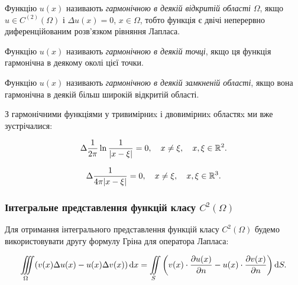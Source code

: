 \begin{definition} 
	Функцію $u(x)$ називають \textit{гармонічною в деякій відкритій області} $\Omega$, якщо $u \in C^{(2)}(\Omega)$ і $\Delta u(x) = 0$, $x \in \Omega$, тобто функція є двічі неперервно диференційованим розв'язком рівняння Лапласа.
\end{definition}

\begin{definition}
	Функцію $u(x)$ називають \textit{гармонічною в деякій точці}, якщо ця функція гармонічна в деякому околі цієї точки.
\end{definition}

\begin{definition}
	Функцію $u(x)$ називають \textit{гармонічною в деякій замкненій області}, якщо вона гармонічна в деякій більш широкій відкритій області.
\end{definition}

З гармонічними функціями у тривимірниx і двовимірниx областяx ми вже зустрічалися:

\begin{example}
	\begin{equation}
		\Delta \frac{1}{2 \pi} \ln \frac{1}{|x - \xi|} = 0, \quad x \ne \xi, \quad x, \xi \in \mathbb{R}^2.
	\end{equation}
\end{example}

\begin{example}
	\begin{equation}
		\Delta \frac{1}{4 \pi |x - \xi|} = 0, \quad x \ne \xi, \quad x, \xi \in \mathbb{R}^3.
	\end{equation}
\end{example}

\subsubsection{Інтегральне представлення функцій класу \texorpdfstring{$C^2(\Omega)$}{C2Omega}}

Для отримання інтегрального представлення функцій класу $C^2(\Omega)$ будемо використовувати другу формулу Гріна для оператора Лапласа:

\begin{equation}
	\displaystyle\iiint\limits_\Omega ( v(x) \Delta u(x) - u(x) \Delta v(x) ) \mathop{}\!\mathrm{d} x = \displaystyle\iint\limits_S \left( v(x) \cdot \frac{\partial u(x)}{\partial n} - u(x) \cdot \frac{\partial v(x)}{\partial n} \right) \mathop{}\!\mathrm{d} S.
\end{equation}

